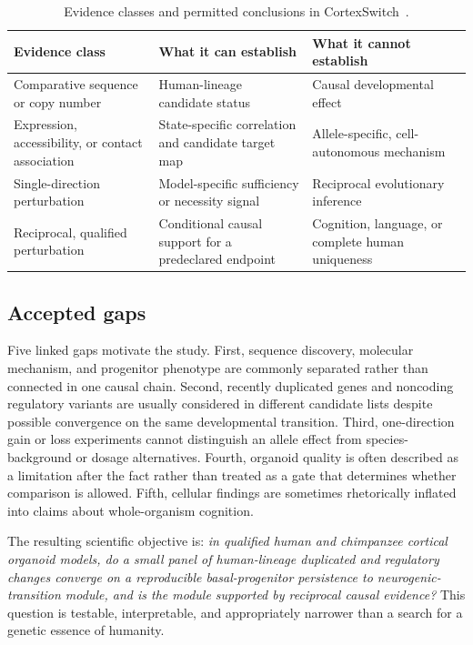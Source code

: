 \documentclass[conference]{IEEEtran}
\newcommand{\csw}{CortexSwitch}
\begin{document}
\begin{table}[t]
\caption{Evidence classes and permitted conclusions in \csw{}~.}
\label{tab:evidence}
\centering
\scriptsize
\renewcommand{\arraystretch}{1.10}
\begin{tabular}{|p{}|p{}|p{}|}
\hline
\textbf{Evidence class} & \textbf{What it can establish} & \textbf{What it cannot establish} \\
\hline
Comparative sequence or copy number & Human-lineage candidate status & Causal developmental effect \\
\hline
Expression, accessibility, or contact association & State-specific correlation and candidate target map & Allele-specific, cell-autonomous mechanism \\
\hline
Single-direction perturbation & Model-specific sufficiency or necessity signal & Reciprocal evolutionary inference \\
\hline
Reciprocal, qualified perturbation & Conditional causal support for a predeclared endpoint & Cognition, language, or complete human uniqueness \\
\hline
\end{tabular}
\end{table}

\subsection{Accepted gaps}

Five linked gaps motivate the study. First, sequence discovery, molecular mechanism, and progenitor phenotype are commonly separated rather than connected in one causal chain. Second, recently duplicated genes and noncoding regulatory variants are usually considered in different candidate lists despite possible convergence on the same developmental transition. Third, one-direction gain or loss experiments cannot distinguish an allele effect from species-background or dosage alternatives. Fourth, organoid quality is often described as a limitation after the fact rather than treated as a gate that determines whether comparison is allowed. Fifth, cellular findings are sometimes rhetorically inflated into claims about whole-organism cognition.

The resulting scientific objective is: \emph{in qualified human and chimpanzee cortical organoid models, do a small panel of human-lineage duplicated and regulatory changes converge on a reproducible basal-progenitor persistence to neurogenic-transition module, and is the module supported by reciprocal causal evidence?} This question is testable, interpretable, and appropriately narrower than a search for a genetic essence of humanity.
\end{document}
